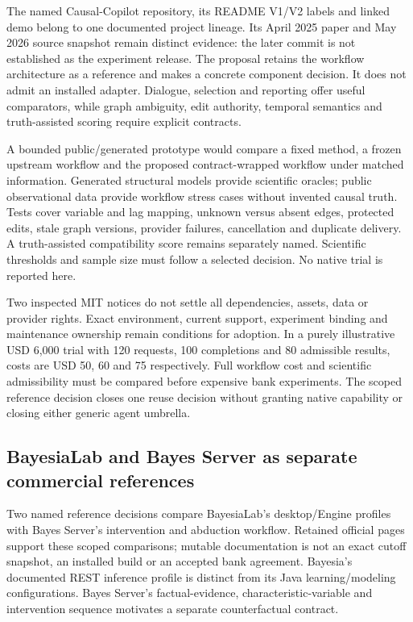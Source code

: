 The named Causal-Copilot repository, its README V1/V2 labels and linked
demo belong to one documented project lineage. Its April 2025 paper and
May 2026 source snapshot remain distinct evidence: the later commit is
not established as the experiment release. The proposal retains the
workflow architecture as a reference and makes a concrete component
decision. It does not admit an installed adapter. Dialogue, selection
and reporting offer useful comparators, while graph ambiguity, edit
authority, temporal semantics and truth-assisted scoring require
explicit contracts.
\citep{exec17_copilot_paper,exec17_copilot_code,exec25_copilot_choice}

A bounded public/generated prototype would compare a fixed method, a
frozen upstream workflow and the proposed contract-wrapped workflow
under matched information. Generated structural models provide
scientific oracles; public observational data provide workflow stress
cases without invented causal truth. Tests cover variable and lag
mapping, unknown versus absent edges, protected edits, stale graph
versions, provider failures, cancellation and duplicate delivery. A
truth-assisted compatibility score remains separately named. Scientific
thresholds and sample size must follow a selected decision. No native
trial is reported here.
\citep{exec17_copilot_exact,exec25_copilot_choice}

Two inspected MIT notices do not settle all dependencies, assets, data
or provider rights. Exact environment, current support, experiment
binding and maintenance ownership remain conditions for adoption. In a
purely illustrative USD 6,000 trial with 120 requests, 100 completions
and 80 admissible results, costs are USD 50, 60 and 75 respectively.
Full workflow cost and scientific admissibility must be compared before
expensive bank experiments. The scoped reference decision closes one
reuse decision without granting native capability or closing either
generic agent umbrella.
\citep{exec17_copilot_rights,exec25_copilot_choice}

\hypertarget{bayesialab-and-bayes-server-as-separate-commercial-references}{%
\subsection{BayesiaLab and Bayes Server as separate commercial
references}\label{bayesialab-and-bayes-server-as-separate-commercial-references}}

Two named reference decisions compare BayesiaLab's desktop/Engine
profiles with Bayes Server's intervention and abduction workflow.
Retained official pages support these scoped comparisons; mutable
documentation is not an exact cutoff snapshot, an installed build or an
accepted bank agreement. Bayesia's documented REST inference profile is
distinct from its Java learning/modeling configurations. Bayes Server's
factual-evidence, characteristic-variable and intervention sequence
motivates a separate counterfactual contract.
\citep{exec13_bayesia_api,exec13_bayesia_professional,exec13_ci_bayesia_criteria,exec13_ci_bayesia_surgery,exec13_ci_bayesia_matching,exec13_ci_bayesserver_causality,exec14_ci_release_history}

